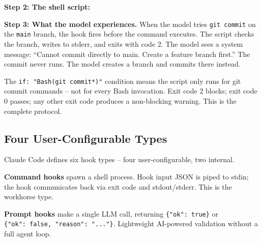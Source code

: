 \documentclass[
  english,
  11pt,
  letterpaper,
]{book}
\newenvironment{Shaded}{\begin{snugshade}}{\end{snugshade}}
\newcommand{\AttributeTok}[1]{\textcolor[rgb]{0.40,0.45,0.13}{#1}}
\newcommand{\BuiltInTok}[1]{\textcolor[rgb]{0.00,0.23,0.31}{#1}}
\newcommand{\CommentTok}[1]{\textcolor[rgb]{0.37,0.37,0.37}{#1}}
\newcommand{\ControlFlowTok}[1]{\textcolor[rgb]{0.00,0.23,0.31}{\textbf{#1}}}
\newcommand{\DecValTok}[1]{\textcolor[rgb]{0.68,0.00,0.00}{#1}}
\newcommand{\FunctionTok}[1]{\textcolor[rgb]{0.28,0.35,0.67}{#1}}
\newcommand{\KeywordTok}[1]{\textcolor[rgb]{0.00,0.23,0.31}{\textbf{#1}}}
\newcommand{\NormalTok}[1]{\textcolor[rgb]{0.00,0.23,0.31}{#1}}
\newcommand{\OperatorTok}[1]{\textcolor[rgb]{0.37,0.37,0.37}{#1}}
\newcommand{\OtherTok}[1]{\textcolor[rgb]{0.00,0.23,0.31}{#1}}
\newcommand{\StringTok}[1]{\textcolor[rgb]{0.13,0.47,0.30}{#1}}
\newcommand{\VariableTok}[1]{\textcolor[rgb]{0.07,0.07,0.07}{#1}}
\begin{document}
\textbf{Step 2: The shell script:}

\begin{Shaded}
\end{Shaded}

\textbf{Step 3: What the model experiences.} When the model tries
\texttt{git\ commit} on the \texttt{main} branch, the hook fires before
the command executes. The script checks the branch, writes to stderr,
and exits with code 2. The model sees a system message: ``Cannot commit
directly to main. Create a feature branch first.'' The commit never
runs. The model creates a branch and commits there instead.

The \texttt{if:\ "Bash(git\ commit*)"} condition means the script only
runs for git commit commands -- not for every Bash invocation. Exit code
2 blocks; exit code 0 passes; any other exit code produces a
non-blocking warning. This is the complete protocol.

\subsection{Four User-Configurable
Types}\label{four-user-configurable-types}

Claude Code defines six hook types -- four user-configurable, two
internal.

\textbf{Command hooks} spawn a shell process. Hook input JSON is piped
to stdin; the hook communicates back via exit code and stdout/stderr.
This is the workhorse type.

\textbf{Prompt hooks} make a single LLM call, returning
\texttt{\{"ok":\ true\}} or
\texttt{\{"ok":\ false,\ "reason":\ "..."\}}. Lightweight AI-powered
validation without a full agent loop.
\end{document}
